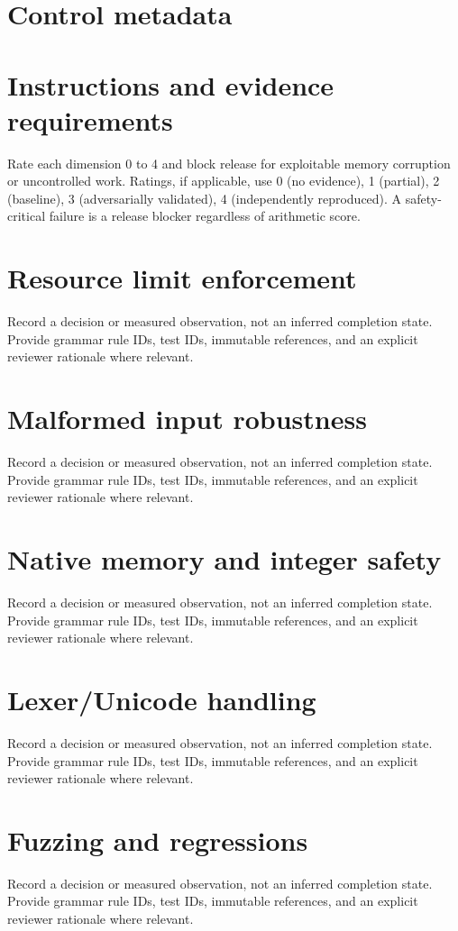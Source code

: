 \documentclass[11pt,letterpaper]{article}
\begin{document}
\makedoctitle\makedocsummary
\tableofcontents\clearpage
\section{Control metadata}
\section{Instructions and evidence requirements}
Rate each dimension 0 to 4 and block release for exploitable memory corruption or uncontrolled work. Ratings, if applicable, use 0 (no evidence), 1 (partial), 2 (baseline), 3 (adversarially validated), 4 (independently reproduced). A safety-critical failure is a release blocker regardless of arithmetic score.
\section{Resource limit enforcement}
Record a decision or measured observation, not an inferred completion state. Provide grammar rule IDs, test IDs, immutable references, and an explicit reviewer rationale where relevant.
\PTRating
\section{Malformed input robustness}
Record a decision or measured observation, not an inferred completion state. Provide grammar rule IDs, test IDs, immutable references, and an explicit reviewer rationale where relevant.
\PTRating
\section{Native memory and integer safety}
Record a decision or measured observation, not an inferred completion state. Provide grammar rule IDs, test IDs, immutable references, and an explicit reviewer rationale where relevant.
\PTRating
\section{Lexer/Unicode handling}
Record a decision or measured observation, not an inferred completion state. Provide grammar rule IDs, test IDs, immutable references, and an explicit reviewer rationale where relevant.
\PTRating
\section{Fuzzing and regressions}
Record a decision or measured observation, not an inferred completion state. Provide grammar rule IDs, test IDs, immutable references, and an explicit reviewer rationale where relevant.
\PTRating
\end{document}
